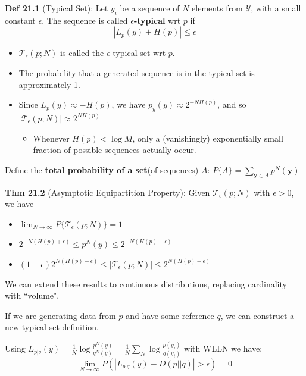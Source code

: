 \documentclass[12pt]{article} %
\begin{document}
\textbf{Def 21.1} (Typical Set): Let $y_i$ be a sequence of $N$ elements from $\mathcal{Y}$, with a small constant $\epsilon$. The sequence is called \textbf{$\epsilon$-typical} wrt $p$ if
\begin{equation*}
    |L_p(y) + H(p)| \leq \epsilon
\end{equation*}
\begin{itemize}[topsep=-1pt, itemsep=-1pt]
    \item 
$\mathcal{T}_\epsilon(p;N)$ is called the $\epsilon$-typical set wrt $p$.
    \item 
The probability that a generated sequence is in the typical set is approximately 1.
    \item 
Since $L_p(y) \approx -H(p)$, we have $p_y(y) \approx 2^{-NH(p)}$, and so $|\mathcal{T}_\epsilon(p;N)| \approx 2^{NH(p)}$
\begin{itemize}[topsep=-1pt, itemsep=-1pt]
    \item Whenever $H(p) < \log M$, only a (vanishingly) exponentially small fraction of possible sequences actually occur.
\end{itemize}
\end{itemize}

Define the \textbf{total probability of a set}(of sequences) $A$: $P\{A\} = \sum_{\mathbf{y} \in A} p^N(\mathbf{y})$

\textbf{Thm 21.2} (Asymptotic Equipartition Property): Given $\mathcal{T}_\epsilon(p;N)$ with $\epsilon > 0$, we have
\begin{itemize}[topsep=-1pt, itemsep=-1pt]
    \item 
$\lim_{N \rightarrow \infty} P\{\mathcal{T}_\epsilon(p;N)\} = 1$
    \item 
$2^{-N(H(p) + \epsilon)} \leq p^N(y) \leq 2^{-N(H(p) - \epsilon)}$
    \item 
$(1- \epsilon)2^{N(H(p) - \epsilon)} \leq |\mathcal{T}_\epsilon(p;N)|
\leq 2^{N(H(p) + \epsilon)}$
\end{itemize}

We can extend these results to continuous distributions, replacing cardinality with ``volume".

\separate

If we are generating data from $p$ and have some reference $q$, we can construct a new typical set definition.

Using $L_{p|q}(y) = \frac{1}{N} \log \frac{p^N(y)}{q^N(y)} = \frac{1}{N} \sum_N \log \frac{p(y_i)}{q(y_i)}$ with WLLN we have: 
$$\lim_{N \rightarrow \infty} P(|L_{p|q}(y) - D(p||q)| > \epsilon) = 0$$
\end{document}
